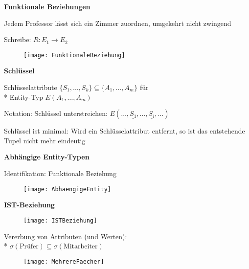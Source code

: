 \textbf{Funktionale Beziehungen}
\begin{items}
	\item Jedem Professor lässt sich ein Zimmer zuordnen, umgekehrt nicht zwingend
	\item Schreibe: \( R: E_1 \to E_2 \)
\end{items}
\begin{figure}[H]\centering\label{FunktionaleBeziehung}\texttt{[image: FunktionaleBeziehung]}\end{figure}

\textbf{Schlüssel}
\begin{items}
	\item Schlüsselattribute \( \{ S_1, \dots, S_k \} \subseteq \{ A_1, \dots, A_m \} \) für \\* Entity-Typ \( E(A_1, \dots, A_m) \)
	\item Notation: Schlüssel unterstreichen: \( E(\dots, \underline{S_1}, \dots, \underline{S_i}, \dots) \)
	\item Schlüssel ist minimal: Wird ein Schlüsselattribut entfernt, so ist das entstehende Tupel nicht mehr eindeutig
\end{items}

\newpage

\textbf{Abhängige Entity-Typen}
\begin{items}
	\item Identifikation: Funktionale Beziehung
\end{items}
\begin{figure}[H]\centering\label{AbhaengigeEntity}\texttt{[image: AbhaengigeEntity]}\end{figure}

\textbf{IST-Beziehung}
\begin{figure}[H]\centering\label{ISTBeziehung}\texttt{[image: ISTBeziehung]}\end{figure}
\begin{items}
	\item Vererbung von Attributen (und Werten): \\* \( \sigma(\text{Prüfer}) \subseteq \sigma(\text{Mitarbeiter}) \)
\end{items}
\begin{figure}[H]\centering\label{MehrereFaecher}\texttt{[image: MehrereFaecher]}\end{figure}

